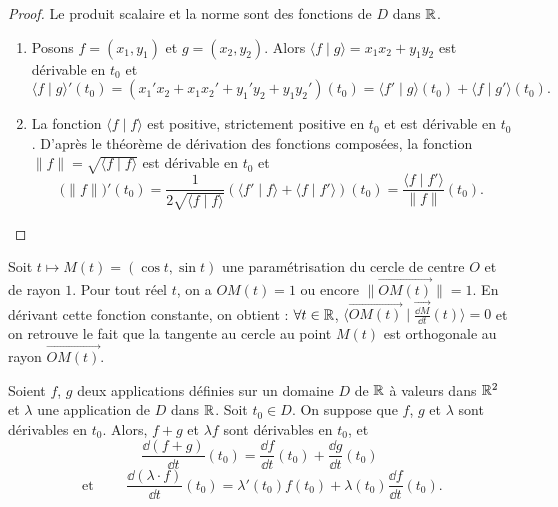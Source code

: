 \documentclass[class=report,crop=false]{standalone}
\begin{document}
\begin{proof}
Le produit scalaire et la norme sont des fonctions de $D$ dans $\mathbb{R}$.
\begin{enumerate}
\item Posons ${f}=(x_1,y_1)$ et ${g}=(x_2,y_2)$.
Alors $\langle{f}\mid{g}\rangle=x_1x_2+y_1y_2$ est dérivable en $t_0$ et
$$\big\langle{f}\mid{g}\big\rangle'(t_0)
=(x_1'x_2+x_1x_2'+y_1'y_2+y_1y_2')(t_0)
=\big\langle{f}'\mid{g}\big\rangle(t_0)+
\big\langle{f}\mid{g}'\big\rangle(t_0).$$

\item La fonction $\big\langle{f}\mid{f}\big\rangle$ est positive,
strictement positive en $t_0$ et est dérivable en $t_0$. D'après
le théorème de dérivation des fonctions composées, la fonction
$\|{f}\|=\sqrt{\big\langle{f}\mid{f}\big\rangle}$
est dérivable en $t_0$ et
$$\big(\|{f}\|\big)'(t_0)
=\frac{1}{2\sqrt{\big\langle{f}\mid{f}\big\rangle}}
\left(\big\langle{f}'\mid{f}\big\rangle
+\big\langle{f}\mid{f}'\big\rangle\right)(t_0)
=\frac{\big\langle{f}\mid{f}'\big\rangle}
{\|{f}\|}(t_0).$$


\end{enumerate}
\end{proof}

\begin{exemple}
Soit  $t\mapsto M(t)=(\cos t,\sin t)$ une
paramétrisation du cercle de centre $O$ et de rayon $1$. Pour tout
réel $t$, on a $OM(t)=1$ ou encore $\|\overrightarrow{OM(t)}\|=1$.
En dérivant cette fonction constante, on obtient : $\forall t\in\mathbb{R}$,
$\big\langle \overrightarrow{OM(t)} \mid \overrightarrow{\frac{\dd M}{\dd t}}(t) \big\rangle =0$ et on
retrouve le fait que la tangente au cercle au point $M(t)$ est
orthogonale au rayon $\overrightarrow{OM(t)}$.

\end{exemple}

\begin{theoreme}
Soient ${f}$, ${g}$ deux applications définies sur un domaine $D$
de $\mathbb{R}$ à valeurs dans $\mathbb{R}^2$ et $\lambda$ une application de $D$
dans $\mathbb{R}$. Soit $t_0\in D$. On suppose que ${f}$, ${g}$ et $\lambda$ sont
dérivables en $t_0$. Alors, ${f}+{g}$ et $\lambda {f}$ sont dérivables en $t_0$, et
$${\frac{\dd({f}+{g})}{\dd t}}(t_0)
={\frac{\dd {f}}{\dd t}}(t_0)+{\frac{\dd {g}}{\dd t}}(t_0)$$
$$\text{ et } \qquad {\frac{\dd(\lambda \cdot {f})}{\dd t}}(t_0)
=\lambda'(t_0){f}(t_0)+\lambda(t_0){\frac{\dd {f}}{\dd t}}(t_0).$$
\end{theoreme}
\end{document}
